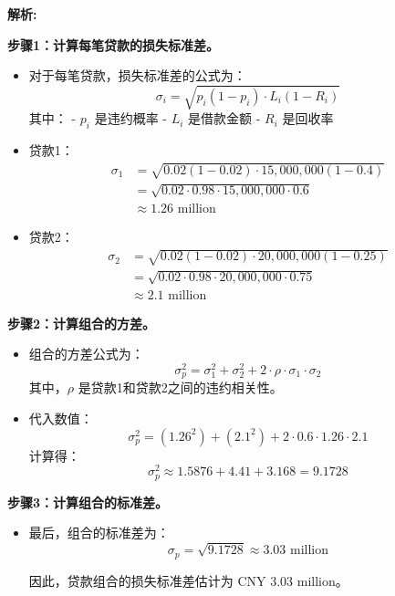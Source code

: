 \documentclass{article}
\newenvironment{explanation}
{\textbf{解析:}\par}
{\par}
\begin{document}
\begin{explanation}
 
    \textbf{步骤1：计算每笔贷款的损失标准差。}
    \begin{itemize}
        \item 对于每笔贷款，损失标准差的公式为：
        \[
        \sigma_i = \sqrt{p_i(1 - p_i) \cdot L_i(1 - R_i)}
        \]
        其中：
        - \(p_i\) 是违约概率
        - \(L_i\) 是借款金额
        - \(R_i\) 是回收率

        \item 贷款1：
        \begin{align*}
        \sigma_1 &= \sqrt{0.02(1 - 0.02) \cdot 15,000,000(1 - 0.4)} \\
                 &= \sqrt{0.02 \cdot 0.98 \cdot 15,000,000 \cdot 0.6} \\
                 &\approx 1.26 \text{ million}
        \end{align*}
        
        \item 贷款2：
        \begin{align*}
        \sigma_2 &= \sqrt{0.02(1 - 0.02) \cdot 20,000,000(1 - 0.25)} \\
                 &= \sqrt{0.02 \cdot 0.98 \cdot 20,000,000 \cdot 0.75} \\
                 &\approx 2.1 \text{ million}
        \end{align*}
    \end{itemize}


    \textbf{步骤2：计算组合的方差。}
    \begin{itemize}
        \item 组合的方差公式为：
        \[
        \sigma_p^2 = \sigma_1^2 + \sigma_2^2 + 2 \cdot \rho \cdot \sigma_1 \cdot \sigma_2
        \]
        其中，\(\rho\) 是贷款1和贷款2之间的违约相关性。

        \item 代入数值：
        \[
        \sigma_p^2 = (1.26^2) + (2.1^2) + 2 \cdot 0.6 \cdot 1.26 \cdot 2.1
        \]
        计算得：
    \[
    \sigma_p^2 \approx 1.5876 + 4.41 + 3.168 = 9.1728
    \]
    \end{itemize}
    \textbf{步骤3：计算组合的标准差。}
    \begin{itemize}
        \item 最后，组合的标准差为：
        \[
        \sigma_p = \sqrt{9.1728} \approx 3.03 \text{ million}
        \]

    因此，贷款组合的损失标准差估计为 CNY 3.03 million。
    \end{itemize}
\end{explanation}
\end{document}
